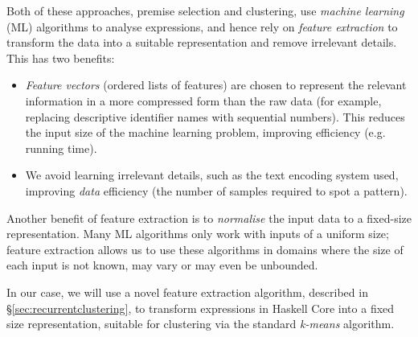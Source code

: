 Both of these approaches, premise selection and clustering, use \emph{machine learning} (ML) algorithms to analyse expressions, and hence rely on \emph{feature extraction} to transform the data into a suitable representation and remove irrelevant details. This has two benefits:

\begin{itemize}
  \item \emph{Feature vectors} (ordered lists of features) are chosen to represent the relevant information in a more compressed form than the raw data (for example, replacing descriptive identifier names with sequential numbers). This reduces the input size of the machine learning problem, improving efficiency (e.g. running time).
  \item We avoid learning irrelevant details, such as the text encoding system used, improving \emph{data} efficiency (the number of samples required to spot a pattern).
\end{itemize}

Another benefit of feature extraction is to \emph{normalise} the input data to a fixed-size representation. Many ML algorithms only work with inputs of a uniform size; feature extraction allows us to use these algorithms in domains where the size of each input is not known, may vary or may even be unbounded.

In our case, we will use a novel feature extraction algorithm, described in \S \ref{sec:recurrentclustering}, to transform expressions in Haskell Core into a fixed size representation, suitable for clustering via the standard \emph{k-means} algorithm.

\iffalse TODO: I have had a look now at section 5. I do not think feature extraction and clustering is explained/defined there, either. Seeing your contribution is feature extraction algorithms, you need to define feature vectors and clusters *here* \fi

\begin{figure}
  \centering

  \caption{}

  \label{fig:featureextractionpic}
\end{figure}

